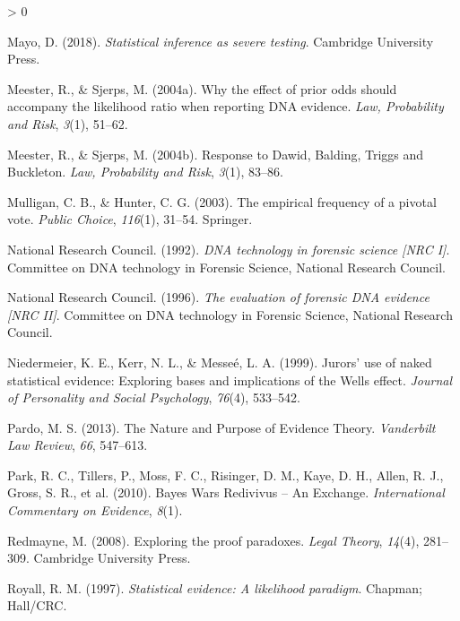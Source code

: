 \documentclass[
  10pt,
  dvipsnames,enabledeprecatedfontcommands]{scrartcl}
\newlength{\cslhangindent}
\newenvironment{CSLReferences}[2] %
 {%
  \setlength{\parindent}{0pt}
  \ifodd #1 \everypar{\setlength{\hangindent}{\cslhangindent}}\ignorespaces\fi
  \ifnum #2 > 0
  \setlength{\parskip}{#2\baselineskip}
  \fi
 }%
 {}
\begin{document}
\begin{CSLReferences}{1}{0}
\leavevmode\hypertarget{ref-mayo2018}{}%
Mayo, D. (2018). \emph{Statistical inference as severe testing}.
Cambridge University Press.

\leavevmode\hypertarget{ref-meester2004WhyEffectPriora}{}%
Meester, R., \& Sjerps, M. (2004a). Why the effect of prior odds should
accompany the likelihood ratio when reporting {DNA} evidence. \emph{Law,
Probability and Risk}, \emph{3}(1), 51--62.

\leavevmode\hypertarget{ref-meester2004ResponseDawidBalding}{}%
Meester, R., \& Sjerps, M. (2004b). Response to {Dawid}, {Balding},
{Triggs} and {Buckleton}. \emph{Law, Probability and Risk}, \emph{3}(1),
83--86.

\leavevmode\hypertarget{ref-mulligan2003empirical}{}%
Mulligan, C. B., \& Hunter, C. G. (2003). The empirical frequency of a
pivotal vote. \emph{Public Choice}, \emph{116}(1), 31--54. Springer.

\leavevmode\hypertarget{ref-NRCI1992}{}%
National Research Council. (1992). \emph{{DNA} technology in forensic
science {\emph{{[}NRC I{]}}}}. Committee on {DNA} technology in
{F}orensic {S}cience, {N}ational {R}esearch {C}ouncil.

\leavevmode\hypertarget{ref-NRCII1996}{}%
National Research Council. (1996). \emph{The evaluation of forensic
{DNA} evidence {\emph{{[}NRC II{]}}}}. Committee on {DNA} technology in
{F}orensic {S}cience, {N}ational {R}esearch {C}ouncil.

\leavevmode\hypertarget{ref-niedermeierEtAl1999}{}%
Niedermeier, K. E., Kerr, N. L., \& Messeé, L. A. (1999). Jurors' use of
naked statistical evidence: Exploring bases and implications of the
{Wells} effect. \emph{Journal of Personality and Social Psychology},
\emph{76}(4), 533--542.

\leavevmode\hypertarget{ref-pardo2013NaturePurposeEvidence}{}%
Pardo, M. S. (2013). The {Nature} and {Purpose} of {Evidence Theory}.
\emph{Vanderbilt Law Review}, \emph{66}, 547--613.

\leavevmode\hypertarget{ref-park2010BayesWarsRedivivus}{}%
Park, R. C., Tillers, P., Moss, F. C., Risinger, D. M., Kaye, D. H.,
Allen, R. J., Gross, S. R., et al. (2010). Bayes {Wars Redivivus} -- {An
Exchange}. \emph{International Commentary on Evidence}, \emph{8}(1).

\leavevmode\hypertarget{ref-redmayne2008exploring}{}%
Redmayne, M. (2008). Exploring the proof paradoxes. \emph{Legal Theory},
\emph{14}(4), 281--309. Cambridge University Press.

\leavevmode\hypertarget{ref-Royall1997}{}%
Royall, R. M. (1997). \emph{Statistical evidence: A likelihood
paradigm}. Chapman; Hall/CRC.


\end{CSLReferences}
\end{document}
